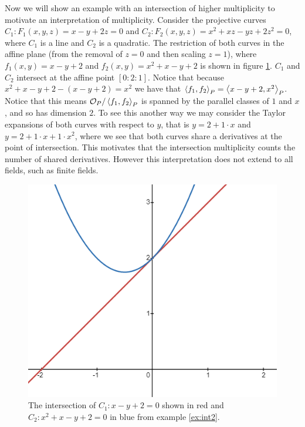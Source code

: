 \begin{example}
\label{ex:int2}
Now we will show an example with an intersection of higher multiplicity to motivate an interpretation of multiplicity. Consider the projective curves $C_1:F_1(x,y,z)=x-y+2z=0$ and  $C_2:F_2(x,y,z)=x^2+xz-yz+2z^2=0$, where $C_1$ is a line and $C_2$ is a quadratic. The restriction of both curves in the affine plane (from the removal of $z=0$ and then scaling $z=1$), where $f_1(x,y)=x-y+2$ and $f_2(x,y)=x^2+x-y+2$ is shown in figure \ref{fig:int2}. $C_1$ and $C_2$ intersect at the affine point $[0:2:1]$. Notice that because $x^2+x-y+2-(x-y+2)=x^2$ we have that $\left\langle f_1,f_2 \right\rangle_P=\left\langle x-y+2,x^2 \right\rangle_P$. Notice that this means $\mathcal{O}_P/\left\langle f_1,f_2 \right\rangle_P$ is spanned by the parallel classes of $1$ and $x$, and so has dimension $2$. To see this another way we may consider the Taylor expansions of both curves with respect to $y$, that is $y=2+1\cdot x$ and $y=2+1\cdot x+1\cdot x^2$, where we see that both curves share a derivatives at the point of intersection. This motivates that the intersection multiplicity counts the number of shared derivatives. However this interpretation does not extend to all fields, such as finite fields.
\begin{figure}
    \centering
    \includegraphics[scale=.5]{pics/graph1.png}
    \caption{The intersection of $C_1:x-y+2=0$ shown in red and $C_2:x^2+x-y+2=0$ in blue from example \ref{ex:int2}.}
    \label{fig:int2}
\end{figure}
\end{example}

